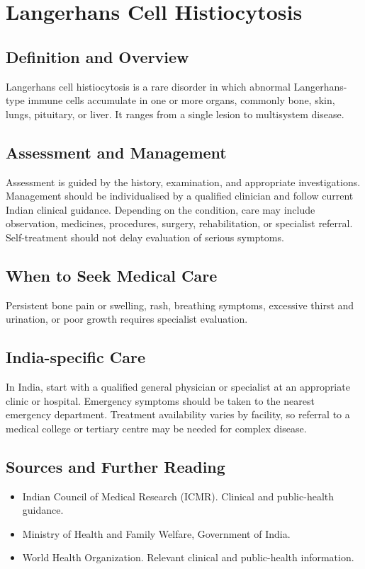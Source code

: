 \chapter{Langerhans Cell Histiocytosis}

\section*{Definition and Overview}
Langerhans cell histiocytosis is a rare disorder in which abnormal Langerhans-type immune cells accumulate in one or more organs, commonly bone, skin, lungs, pituitary, or liver. It ranges from a single lesion to multisystem disease.

\section*{Assessment and Management}
Assessment is guided by the history, examination, and appropriate investigations. Management should be individualised by a qualified clinician and follow current Indian clinical guidance. Depending on the condition, care may include observation, medicines, procedures, surgery, rehabilitation, or specialist referral. Self-treatment should not delay evaluation of serious symptoms.

\section*{When to Seek Medical Care}
Persistent bone pain or swelling, rash, breathing symptoms, excessive thirst and urination, or poor growth requires specialist evaluation.

\section*{India-specific Care}
In India, start with a qualified general physician or specialist at an appropriate clinic or hospital. Emergency symptoms should be taken to the nearest emergency department. Treatment availability varies by facility, so referral to a medical college or tertiary centre may be needed for complex disease.

\section*{Sources and Further Reading}
\begin{itemize}
    \item Indian Council of Medical Research (ICMR). Clinical and public-health guidance.
    \item Ministry of Health and Family Welfare, Government of India.
    \item World Health Organization. Relevant clinical and public-health information.
\end{itemize}

